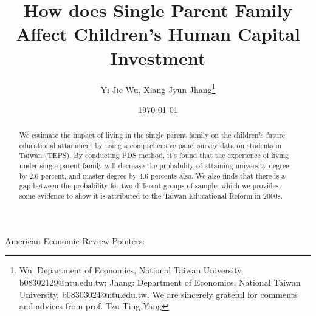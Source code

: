 \documentclass[]{AEA}
\begin{document}
\title{How does Single Parent Family Affect Children's Human Capital Investment}
\author{Yi Jie Wu, Xiang Jyun Jhang\thanks{Wu: Department of Economics, National Taiwan University, b08302129@ntu.edu.tw; Jhang: Department of Economics, National Taiwan University, b08303024@ntu.edu.tw.  We are sincerely grateful for comments and advices from prof. Tzu-Ting Yang}}
\date{\today}

\begin{abstract}
    We estimate the impact of living in the single parent family on the children's future educational attainment by using a comprehensive panel survey data on students in Taiwan (TEPS).  By conducting PDS method, it's found that the experience of living under single parent family will decrease the probability of attaining university degree by 2.6 percent, and master degree by 4.6 percents also.  We also finds that there is a gap between the probability for two different groups of sample, which we provides some evidence to show it is attributed to the Taiwan Educational Reform in 2000s.
\end{abstract}


\maketitle

American Economic Review Pointers:
\end{document}
